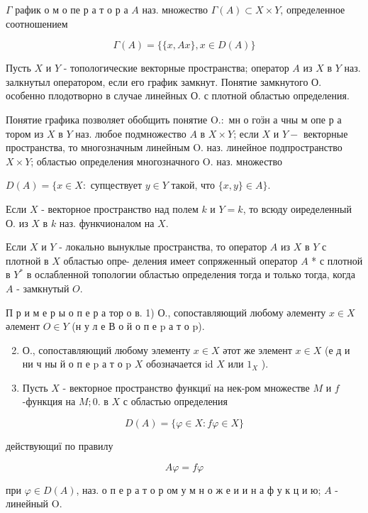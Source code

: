 \documentclass[10pt]{article}
\begin{document}
$\Gamma$ рафик о м о пе р а т о р а $A$ наз. множество $\Gamma(A) \subset X \times Y$, определенное соотношением

\[
\Gamma(A)=\{\{x, A x\}, x \in D(A)\}
\]

Пусть $X$ и $Y$ - топологические векторные пространства; оператор $A$ из $X$ в $Y$ наз. залкнутыл оператором, если его график замкнут. Понятие замкнутого О. особенно плодотворно в случае линейных $О$. с плотной областью определения.

Понятие графика позволяет обобщить понятие $\mathrm{O} .:$ мн о гоӟн а чны м опе р а тором из $X$ в $Y$ наз. любое подмножество $A$ в $X \times Y$; если $X$ и $Y-$ векторные пространства, то многозначным линейным O. наз. линейное подпространство $X \times Y$; областью определения многозначного $\mathrm{O}$. наз. множество

$D(A)=\{x \in X:$ супцествует $y \in Y$ такой, что $\{x, y\} \in A\}$.

Если $X$ - векторное пространство над полем $k$ и $Y=k$, то всюду оиределенный О. из $X$ в $k$ наз. функчионалом на $X$.

Если $X$ и $Y$ - локально вынуклые пространства, то оператор $A$ из $X$ в $Y$ с плотной в $X$ областью опре- деления имеет сопряженный оператор $A$ * с плотной в $Y^{*}$ в ослабленной топологии областью определения тогда и только тогда, когда $A$ - замкнутый $O$.

П р и м е р ы о п е р а тор о в. 1) О., сопоставляющий любому әлементу $x \in X$ әлемент $O \in Y$ (н у л е В $о$ й $о$ п е p а т о p).

\begin{enumerate}
  \setcounter{enumi}{1}
  \item О., сопоставляющий любому элементу $x \in X$ әтот же элемент $x \in X$ (е д и ни ч ны й о п е p а т о p $X$ обозначается id $X$ или $1_{X}$ ).

  \item Пусть $X$ - векторное пространство функциї на нек-ром множестве $M$ и $f$-функция на $M ; 0$. в $X$ с областью определения

\end{enumerate}

\[
D(A)=\{\varphi \in X: f \varphi \in X\}
\]

действующиї по правилу

\[
A \varphi=f \varphi
\]

при $\varphi \in D(A)$, наз. о п е р а т о р ом у м н о ж е и и н а ф у к ц и ю; $A$ - линейный $\mathrm{O}$.
\end{document}
